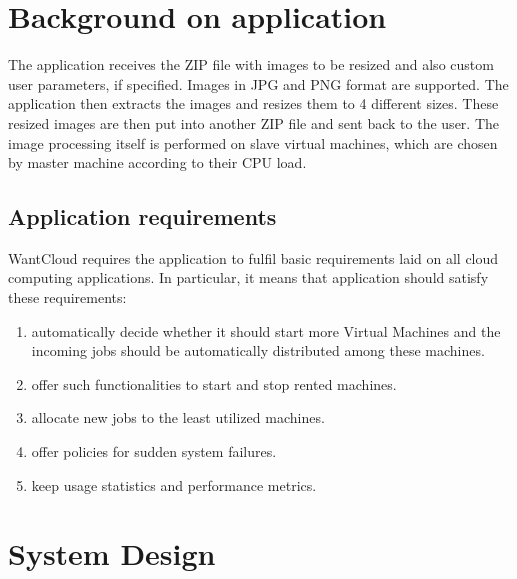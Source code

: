 \section{Background on application}\label{back}
The application receives the ZIP file with images to be resized and also custom user parameters, if specified. Images in JPG and PNG format are supported. The application then extracts the images and resizes them to 4 different sizes. These resized images are then put into another ZIP file and sent back to the user. The image processing itself is performed on slave virtual machines, which are chosen by master machine according to their CPU load.

\subsection{Application requirements}
WantCloud requires the application to fulfil basic requirements laid on all cloud computing applications. In particular, it means that application should satisfy these requirements:

\begin{enumerate}
The system should...
 \item automatically decide whether it should start more Virtual Machines and the incoming jobs should be automatically distributed among these machines.
 \item offer such functionalities to start and stop rented machines.
 \item allocate new jobs to the least utilized machines.
 \item offer policies for sudden system failures.
 \item keep usage statistics and performance metrics.
\end{enumerate}

\section{System Design}\label{sysdesign}
